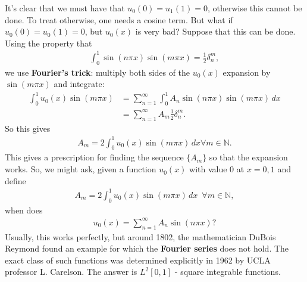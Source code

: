 \documentclass{book}
\theoremstyle{definition}
\begin{document}
It's clear that we must have that $u_0(0) = u_1(1) = 0$, otherwise this cannot be done. To treat otherwise, one needs a cosine term. But what if $u_0(0) = u_0(1) = 0$, but $u_0(x)$ is very bad? Suppose that this can be done. Using the property that 
\begin{align*}
\int_{0}^1 \sin(n\pi x)\sin(m\pi x) = \frac{1}{2}\delta^m_n,
\end{align*}
we use \textbf{Fourier's trick}: multiply both sides of the $u_0(x)$ expansion by $\sin(m \pi x)$ and integrate:
\begin{align*}
\int^1_0 u_0(x)\sin(m \pi x) &= \sum_{n=1}^\infty\int_{0}^1A_n\sin(n\pi x)\sin(m \pi x)\,dx\\
&= \sum_{n=1}^\infty A_m\frac{1}{2}\delta^m_n.
\end{align*}
So this gives
\begin{align*}
A_m = 2\int^1_0 u_0(x)\sin(m\pi x)\,dx \forall m\in \mathbb{N}.
\end{align*}
This gives a prescription for finding the sequence $\{A_m \}$ so that the expansion works. So, we might ask, given a function $u_0(x)$ with value 0 at $x=0,1$ and define
\begin{align*}
A_m = 2\int^1_0 u_0(x)\sin(m\pi x)\,dx\,\,\, \forall m\in \mathbb{N},
\end{align*}
when does 
\begin{align*}
u_0(x) = \sum^\infty_{n=1}A_n \sin(n\pi x)?
\end{align*}
Usually, this works perfectly, but around 1802, the mathematician DuBois Reymond found an example for which the \textbf{Fourier series} does not hold. The exact class of such functions was determined explicitly in 1962 by UCLA professor L. Carelson. The answer is $L^2[0,1]$ - square integrable functions. \\
\end{document}
